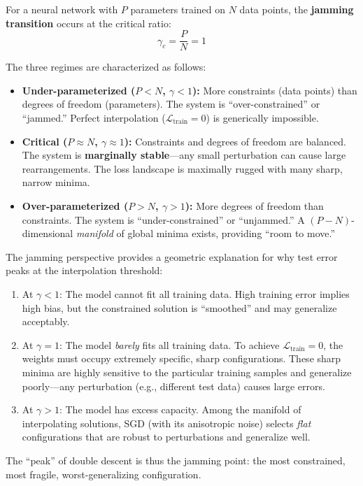 \documentclass[
  journal=largetwo,
  simfonts=false,
  year=2025,
  volume=37,
]{cup-journal}
\begin{document}
\begin{definition}\label{def:jamming_nn}
For a neural network with $P$ parameters trained on $N$ data points, the \textbf{jamming transition} occurs at the critical ratio:
\begin{equation}
    \gamma_c = \frac{P}{N} = 1
\end{equation}

The three regimes are characterized as follows:
\begin{itemize}
    \item \textbf{Under-parameterized ($P < N$, $\gamma < 1$):} More constraints (data points) than degrees of freedom (parameters). The system is ``over-constrained'' or ``jammed.'' Perfect interpolation ($\mathcal{L}_{\text{train}} = 0$) is generically impossible.
    
    \item \textbf{Critical ($P \approx N$, $\gamma \approx 1$):} Constraints and degrees of freedom are balanced. The system is \textbf{marginally stable}---any small perturbation can cause large rearrangements. The loss landscape is maximally rugged with many sharp, narrow minima.
    
    \item \textbf{Over-parameterized ($P > N$, $\gamma > 1$):} More degrees of freedom than constraints. The system is ``under-constrained'' or ``unjammed.'' A $(P - N)$-dimensional \textit{manifold} of global minima exists, providing ``room to move.''
\end{itemize}
\end{definition}

\begin{remark}
The jamming perspective provides a geometric explanation for why test error peaks at the interpolation threshold:

\begin{enumerate}
    \item At $\gamma < 1$: The model cannot fit all training data. High training error implies high bias, but the constrained solution is ``smoothed'' and may generalize acceptably.
    
    \item At $\gamma = 1$: The model \textit{barely} fits all training data. To achieve $\mathcal{L}_{\text{train}} = 0$, the weights must occupy extremely specific, sharp configurations. These sharp minima are highly sensitive to the particular training samples and generalize poorly---any perturbation (e.g., different test data) causes large errors.
    
    \item At $\gamma > 1$: The model has excess capacity. Among the manifold of interpolating solutions, SGD (with its anisotropic noise) selects \textit{flat} configurations that are robust to perturbations and generalize well.
\end{enumerate}

The ``peak'' of double descent is thus the jamming point: the most constrained, most fragile, worst-generalizing configuration.
\end{remark}
\end{document}
